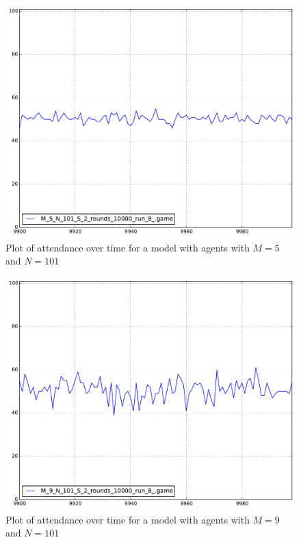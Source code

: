 \begin{figure}[h]
\begin{center}
\includegraphics[scale=0.4]{images/minority/attendance_m5_n101.pdf}
\caption{Plot of attendance over time for a model with agents with $M=5$ and $N=101$}
\label{fig:attendance_m5}
\end{center}
\end{figure}

\begin{figure}[h]
\begin{center}
\includegraphics[scale=0.4]{images/minority/attendance_m9_n101.pdf}
\caption{Plot of attendance over time for a model with agents with $M=9$ and $N=101$}
\label{fig:attendance_m9}
\end{center}
\end{figure}

